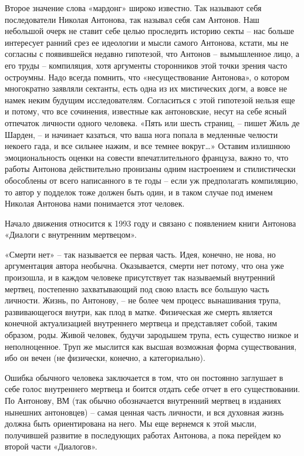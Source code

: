 \begin{pairs}
\begin{Leftside}
\beginnumbering
{\rusky
\pstart
Второе значение слова «мардонг» широко известно. Так называют себя последователи Николая Антонова, так называл себя сам Антонов. Наш небольшой очерк не ставит себе целью проследить историю секты -- нас больше интересует ранний \linebreak срез ее идеологии и мысли самого Антонова, кстати, мы не согласны с появившейся не\-давно гипотезой, что Антонов -- вымышленное лицо, а его труды -- компиляция, хотя аргументы сторонников этой точки зрения часто остроумны. Надо всегда помнить, что «несуществование Антонова», о котором многократно заявляли сектанты, есть одна из их мистических догм, а вовсе не намек неким будущим исследователям. Согласиться с этой гипотезой нельзя еще и потому, что все сочинения, известные как антоновские, несут на себе ясный отпечаток личности одного человека. «Пять или шесть страниц, -- пишет Жиль де Шарден, -- и начинает казаться, что ваша нога попала в медленные челюсти некоего гада, и все сильнее нажим, и все темнее вокруг\ldots» Оставим излишнюю эмоциональность оценки на совести впечатлительного француза, важно то, что работы Антонова дейст\-вительно пронизаны одним настроением и стилистически обособлены от всего написанного в те годы -- если уж предполагать компиляцию, то автор у подделок тоже должен быть один, и в таком случае под именем Николая Антонова нами понимается этот человек.
\pend

\pstart
Начало движения относится к 1993 году и связано с появлением книги Антонова «Диалоги с внутренним мертвецом».

«Смерти нет» -- так называется ее первая часть. Идея, конечно, не нова, но аргументация автора необычна. Оказывается, смерти нет потому, что она уже произошла, и в каждом человеке присутствует так называемый внутренний мертвец, постепенно захватывающий под свою власть все большую часть личности. Жизнь, по Антонову, -- не более чем процесс вынашивания трупа, развивающегося внутри, как плод в матке. Физическая же смерть является конечной актуализацией внутреннего мертвеца и представляет собой, таким образом, роды. Живой человек, будучи зародышем трупа, есть существо низкое и неполноценное. Труп же мыслится как высшая возможная форма существования, ибо он вечен (не физически, конечно, а категориально).
\pend

\pstart
Ошибка обычного человека заключается в том, что он постоянно заглушает в себе голос внутреннего мертвеца и боится отдать себе отчет в его существовании. По Антонову, ВМ (так обычно обозначается внутренний мертвец в изданиях нынешних антоновцев) -- самая ценная часть личности, и вся духовная жизнь должна быть ориентирована на него. Мы еще вернемся к этой мысли, получившей развитие в последующих работах Антонова, а пока перейдем ко второй части «Диалогов».
\pend

}
\end{Leftside}
\end{pairs}
